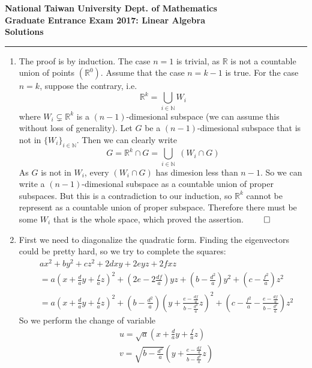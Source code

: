 \begin{center}
    \textbf{National Taiwan University Dept. of Mathematics \\ Graduate Entrance Exam 2017: Linear Algebra \\ Solutions} 
    \noindent\rule{\textwidth}{0.4pt}
\end{center}
\begin{enumerate}
    \item The proof is by induction. The case $n = 1$ is trivial, as $\mathbb{R}$ is not a countable union of points $(\mathbb{R}^0)$. Assume that the case $n = k - 1$ is true. For the case $n = k$, suppose the contrary, i.e.
    \[
    \mathbb{R}^k = \bigcup_{i \in \mathbb{N}} W_i	
    \]
    where $W_i \subsetneq \mathbb{R}^k$ is a $(n-1)$-dimesional subspace (we can assume this without loss of generality). Let $G$ be a $(n-1)$-dimesional subspace that is not in $\{W_i\}_{i \in \mathbb{N}}$. Then we can clearly write
    \[
        G = \mathbb{R}^k \cap G = \bigcup_{i \in \mathbb{N}} \;(W_i \cap G)
    \]
    As $G$ is not in $W_i$, every $(W_i \cap G)$ has dimesion less than $n-1$. So we can write a $(n-1)$-dimesional subspace as a countable union of proper subspaces. But this is a contradiction to our induction, so $\mathbb{R}^k$ cannot be represent as a countable union of proper subspace. Therefore there must be some $W_i$ that is the whole space, which proved the assertion. $\qed$
    \item First we need to diagonalize the quadratic form. Finding the eigenvectors could be pretty hard, so we try to complete the squares:
    \begin{align*}
        &ax^2 + by^2 + cz^2 + 2dxy + 2eyz + 2fxz \\ 
        &= a\left(x + \frac{d}{a}y + \frac{f}{a}z\right)^2 + \left(2e-2\frac{df}{a}\right)yz + \left(b-\frac{d^2}{a}\right)y^2 + \left(c-\frac{f^2}{a}\right)z^2 \\ 
        &= a\left(x + \frac{d}{a}y + \frac{f}{a}z\right)^2 + \left(b-\frac{d^2}{a}\right)\left(y+\frac{e-\frac{df}{a}}{b-\frac{d^2}{a}}z\right)^2 + \left(c-\frac{f^2}{a} - \frac{e-\frac{df}{a}}{b-\frac{d^2}{a}}\right)z^2
    \end{align*}
    So we perform the change of variable
    \begin{align*}
        &u = \sqrt{a}\left(x + \frac{d}{a}y + \frac{f}{a}z\right) \\
        &v = \sqrt{b-\frac{d^2}{a}}\left(y+\frac{e-\frac{df}{a}}{b-\frac{d^2}{a}}z\right) \\

\end{align*}
\end{enumerate}
